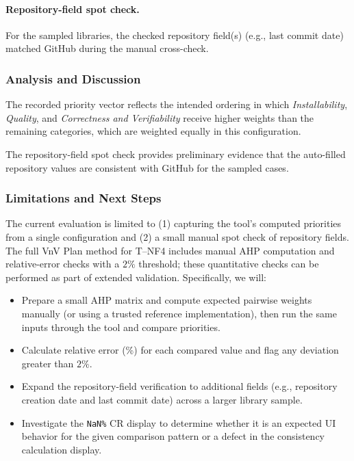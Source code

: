 \documentclass[12pt, titlepage]{article}
\begin{document}
\paragraph{Repository-field spot check.}
For the sampled libraries, the checked repository field(s) (e.g., last commit
date) matched GitHub during the manual cross-check.

\subsubsection{Analysis and Discussion}
The recorded priority vector reflects the intended ordering in which
\emph{Installability}, \emph{Quality}, and \emph{Correctness and Verifiability}
receive higher weights than the remaining categories, which are weighted
equally in this configuration.

The repository-field spot check provides preliminary evidence that the
auto-filled repository values are consistent with GitHub for the sampled
cases.

\subsubsection{Limitations and Next Steps}
The current evaluation is limited to (1) capturing the tool's computed priorities
from a single configuration and (2) a small manual spot check of repository
fields. The full VnV Plan method for T--NF4 includes manual AHP computation
and relative-error checks with a $2\%$ threshold; these quantitative checks
can be performed as part of extended validation. Specifically, we will:
\begin{itemize}
  \item Prepare a small AHP matrix and compute expected pairwise weights
        manually (or using a trusted reference implementation), then run the
        same inputs through the tool and compare priorities.
  \item Calculate relative error (\%) for each compared value and flag any
        deviation greater than $2\%$.
  \item Expand the repository-field verification to additional fields
        (e.g., repository creation date and last commit date) across a larger
        library sample.
  \item Investigate the \texttt{NaN\%} CR display to determine whether it is an
        expected UI behavior for the given comparison pattern or a defect in
        the consistency calculation display.
\end{itemize}
\end{document}
